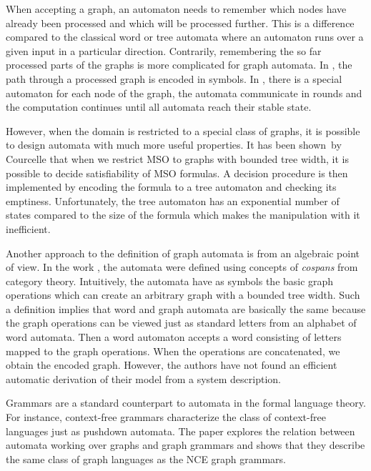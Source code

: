 	When accepting a graph, an automaton needs to remember which nodes have already been
	processed and which will be processed further.
	This is a difference compared to the classical word or tree automata where an automaton runs over
	a given input in a particular direction.
	Contrarily, remembering the so far processed parts of the graphs is more complicated for graph automata.
	In \cite{Thomas:automata}, the path through a processed graph is encoded in symbols.
	In \cite{soa-reiter15}, there is a special automaton for each node of the graph, the automata
	communicate in rounds and the computation continues until all automata reach their stable state.

	However, when the domain is restricted to a special class of graphs, it is possible to design
	automata with much more useful properties.
	It has been shown~by Courcelle \cite{courcell_graph_2012} that when we restrict MSO to graphs 
	with bounded tree width, it is possible to decide satisfiability of MSO formulas.
	A decision procedure is then implemented by encoding the formula to a tree automaton
	and checking its emptiness.
	Unfortunately, the tree automaton has an exponential number of states
	compared to the size of the formula which makes the manipulation with it inefficient.

	Another approach to the definition of graph automata is from an algebraic point of view.
	In the work \cite{soa-blume:2012}, the automata were defined using concepts
	of \emph{cospans} from category theory.
	Intuitively, the automata have as symbols the basic graph operations which can create
	an arbitrary graph with a bounded tree width.
	Such a definition implies that word and graph automata are basically the same
	because the graph operations can be viewed just as standard letters from an alphabet of word automata.
	Then a word automaton accepts a word consisting of letters mapped to the graph operations.
	When the operations are concatenated, we obtain the encoded graph.
	However, the authors have not found an efficient automatic derivation of their model
	from a system description.

	Grammars are a standard counterpart to automata in the formal language theory.
	For instance, context-free grammars characterize the class of context-free languages just
	as pushdown automata.
	The paper \cite{soa-brandenburg05} explores the relation between automata working over
	graphs and graph grammars and shows that they describe the same class of graph languages as
	the NCE graph grammars.
	
